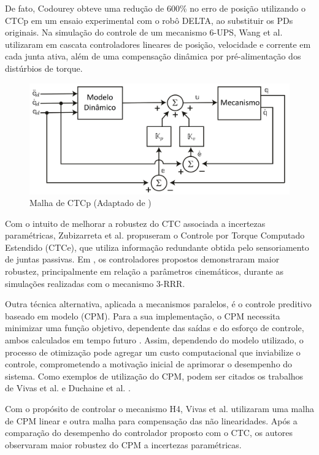 \documentclass[]{politex}
\begin{document}
De fato, Codourey \cite{Codourey} obteve uma redução de 600\% no erro de posição utilizando o CTCp em um ensaio experimental com o robô DELTA, ao substituir os PDs originais. Na simulação do controle de um mecanismo 6-UPS, Wang et al. \cite{Wang} utilizaram em cascata controladores lineares de posição, velocidade e corrente em cada junta ativa, além de  uma compensação dinâmica por pré-alimentação dos distúrbios de torque.

\begin{figure}[h]
	\centering
	\includegraphics[scale=0.385]{../figures/CTCp.jpg}  
	\caption{Malha de CTCp (Adaptado de \cite{Craig})}
	\label{fig:CTCp}
\end{figure}

Com o intuito de melhorar a robustez do CTC associada a incertezas paramétricas, Zubizarreta et al. \cite{Zubizarreta, Zubizarreta2, Zubizarreta3, Zubizarreta4} propuseram  o  Controle por Torque Computado Estendido (CTCe), que utiliza informação redundante obtida pelo sensoriamento de juntas passivas. Em \cite{Zubizarreta}, os controladores propostos demonstraram maior robustez, principalmente em relação a parâmetros cinemáticos, durante as simulações realizadas com o mecanismo 3-RRR.

Outra técnica alternativa, aplicada a mecanismos paralelos, é o controle preditivo baseado em modelo (CPM). Para a sua implementação, o CPM necessita minimizar uma função objetivo, dependente das saídas e do esforço de controle, ambos calculados em tempo futuro \cite{Camacho}. Assim, dependendo do modelo utilizado, o processo de otimização pode agregar um custo computacional que inviabilize o controle, comprometendo a motivação inicial de aprimorar o desempenho do sistema. Como exemplos de utilização do CPM, podem ser citados os trabalhos de Vivas et al. \cite{Vivas} e   Duchaine et al. \cite{Duchaine}.

Com o propósito de controlar o mecanismo H4, Vivas et al. \cite{Vivas} utilizaram  uma malha de CPM linear e outra malha para compensação das não linearidades. Após a comparação do desempenho do controlador proposto com  o CTC, os autores observaram maior robustez do CPM a incertezas paramétricas. 
\end{document}
